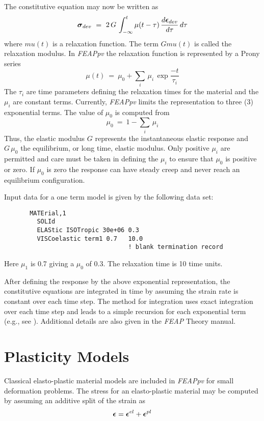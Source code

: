 The constitutive equation may now be written as
\begin{equation}
\boldsymbol{\sigma}_{dev} ~=~ 2 \, G \, \int_{-\infty}^t
\mu(t - \tau ) \, \frac{d \boldsymbol{\epsilon}_{dev}}{d \tau} \, d \tau
\end{equation}
where $mu(t)$ is a relaxation function.  The term $G mu(t)$ is called the
relaxation modulus.   In {\sl FEAPpv} the relaxation function is represented
by a Prony series
\begin{equation}
\mu(t) ~=~  \mu_0 + \sum_i \, \mu_i \, \exp \frac{-t}{\tau_i}
\end{equation}
The $\tau_i$ are time parameters defining the relaxation times
for the material and the $\mu_i$ are constant terms.  Currently, {\sl FEAPpv}
limits the representation to three (3) exponential terms.
The value of $\mu_0$ is computed from
\begin{equation}
\mu_0 ~=~  1 - \sum_i \, \mu_i
\end{equation}
Thus, the elastic modulus $G$ represents the instantaneous elastic response
and $G \, \mu_0$ the equilibrium, or long time, elastic modulus.
Only positive $\mu_i$ are permitted and care must
be taken in defining the $\mu_i$ to ensure that $\mu_0$ is positive or zero.
If $\mu_0$ is zero the response can have steady creep and never reach an
equilibrium configuration.

Input data for a one term model is given by the following data set:
\begin{verbatim}
       MATErial,1
         SOLId
         ELAStic ISOTropic 30e+06 0.3
         VISCoelastic term1 0.7   10.0
                                  ! blank termination record
\end{verbatim}
Here $\mu_1$ is 0.7 giving a $\mu_0$ of 0.3.  The relaxation time
is 10 time units.

After defining the response by the above exponential representation, the
constitutive equations are integrated in time by assuming the
strain rate is constant over each time step.  The method for integration
uses exact integration over each time step and leads to a simple recursion
for each exponential term (e.g., see \cite{taylorpg}).  Additional details
are also given in the {\sl FEAP} Theory manual.

\section{Plasticity Models}
\label{plasmod}

Classical elasto-plastic material models are included in {\sl FEAPpv} for
small deformation problems.
The stress for an elasto-plastic material may be computed by assuming
an additive split of the strain as
\begin{equation}
\boldsymbol{\epsilon} = \boldsymbol{\epsilon}^{el} + \boldsymbol{\epsilon}^{pl}
\end{equation}

